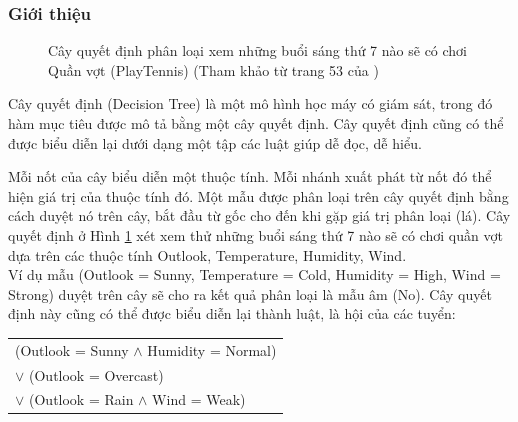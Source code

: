 \documentclass[12pt]{extarticle}
\begin{document}
			\subsubsection*{Giới thiệu}
				\begin{figure}[H]
					\label{fig:tree}
					\centering
										
					\caption{Cây quyết định phân loại xem những buổi sáng thứ 7 nào sẽ có chơi Quần vợt (PlayTennis) (Tham khảo từ trang 53 của \cite{mltextbook})}
				\end{figure}
				\par Cây quyết định (Decision Tree) là một mô hình học máy có giám sát, trong đó hàm mục tiêu được mô tả bằng một cây quyết định. Cây quyết định cũng có thể được biểu diễn lại dưới dạng một tập các luật giúp dễ đọc, dễ hiểu.
				\par Mỗi nốt của cây biểu diễn một thuộc tính. Mỗi nhánh xuất phát từ nốt đó thể hiện giá trị của thuộc tính đó. Một mẫu được phân loại trên cây quyết định bằng cách duyệt nó trên cây, bắt đầu từ gốc cho đến khi gặp giá trị phân loại (lá). 
				Cây quyết định ở Hình \ref{fig:tree} xét xem thử những buổi sáng thứ 7 nào sẽ có chơi quần vợt dựa trên các thuộc tính Outlook, Temperature, Humidity, Wind.
				\\Ví dụ mẫu (Outlook = Sunny, Temperature = Cold, Humidity = High, Wind = Strong) duyệt trên cây sẽ cho ra kết quả phân loại là mẫu âm (No). Cây quyết định này cũng có thể được biểu diễn lại thành luật, là hội của các tuyển:
				\begin{center}
					\begin{tabular}{l}				
						(Outlook = Sunny $\wedge$ Humidity = Normal)
						\\$\lor$ (Outlook = Overcast)
						\\$\lor$ (Outlook = Rain $\wedge$ Wind = Weak)
					\end{tabular}
				\end{center}											
\end{document}
